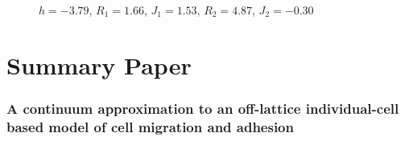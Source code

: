 \documentclass[12pt,letterpaper,cm]{article}
\renewcommand{\.}{\cdot}
\newcommand{\<}{\langle}
\renewcommand{\>}{\rangle}
\begin{document}
	\begin{figure}[hbt]
		\centering
		
		\caption{$h = -3.79$, $R_1 = 1.66$, $J_1 = 1.53$, $R_2 = 4.87$,  $J_2 = -0.30$}
		\label{fig:FastVar}
		
	\end{figure}
	
	
	
	
	
	\clearpage
	
	
	
	
	\part*{Summary Paper}
	\section*{A continuum approximation to an off-lattice individual-cell based model of cell migration and adhesion \cite{Middleton2014} }
	
	
	
%	
%	
%	
%	
%	
%	
%	
%	
%	
\end{document}
